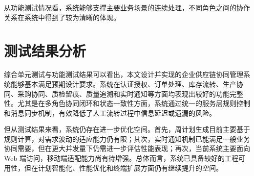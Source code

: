 从功能测试情况看，系统能够支撑主要业务场景的连续处理，不同角色之间的协作关系在系统中得到了较为清晰的体现。

\section{测试结果分析}

综合单元测试与功能测试结果可以看出，本文设计并实现的企业供应链协同管理系统能够基本满足预期设计要求。系统在认证授权、订单处理、库存流转、生产协同、采购协同、质检留痕、质量追溯和实时通知等方面均表现出较好的功能完整性。尤其是在多角色协同闭环和状态一致性方面，系统通过统一的服务层规则控制和消息同步机制，有效降低了人工流转过程中信息延迟或遗漏的风险。

但从测试结果来看，系统仍存在进一步优化空间。首先，周计划生成目前主要基于规则计算，对需求波动的适应能力仍有限；其次，实时通知机制已能满足一般业务协同需要，但在更大并发量下仍需进一步评估性能表现；再次，当前系统主要面向 Web 端访问，移动端适配能力尚有待增强。总体而言，系统已具备较好的工程可用性，但在计划智能化、性能优化和终端扩展方面仍有继续提升的空间。
